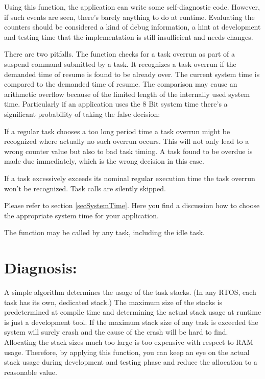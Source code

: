 Using this function, the application can write some self-diagnostic code.
However, if such events are seen, there's barely anything to do at
runtime. Evaluating the counters should be considered a kind of debug
information, a hint at development and testing time that the
implementation is still insufficient and needs changes.

There are two pitfalls. The function checks for a task overrun as part of
a suspend command submitted by a task. It recognizes a task overrun if the
demanded time of resume is found to be already over. The current system
time is compared to the demanded time of resume. The comparison may cause
an arithmetic overflow because of the limited length of the internally
used system time. Particularly if an application uses the 8 Bit system
time there's a significant probability of taking the false decision:

If a regular task chooses a too long period time a task overrun might be
recognized where actually no such overrun occurs. This will not only lead
to a wrong counter value but also to bad task timing. A task found to be
overdue is made due immediately, which is the wrong decision in this
case.

If a task excessively exceeds its nominal regular execution time the task
overrun won't be recognized. Task calls are silently skipped.

Please refer to section \ref{secSystemTime}. Here you find a discussion
how to choose the appropriate system time for your application.

The function  may be called by any task,
including the idle task.


\section{Diagnosis: }

A simple algorithm determines the usage of the task stacks. (In any RTOS,
each task has its own, dedicated stack.) The maximum size of the stacks is
predetermined at compile time and determining the actual stack usage at
runtime is just a development tool. If the maximum stack size of any task
is exceeded the system will surely crash and the cause of the crash will
be hard to find. Allocating the stack sizes much too large is too
expensive with respect to RAM usage. Therefore, by applying this function,
you can keep an eye on the actual stack usage during development and
testing phase and reduce the allocation to a reasonable value.

